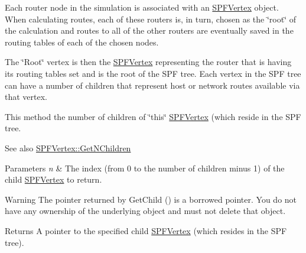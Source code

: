 Each router node in the simulation is associated with an \hyperlink{classns3_1_1SPFVertex}{S\+P\+F\+Vertex} object. When calculating routes, each of these routers is, in turn, chosen as the \char`\"{}root\char`\"{} of the calculation and routes to all of the other routers are eventually saved in the routing tables of each of the chosen nodes.

The \char`\"{}\+Root\char`\"{} vertex is then the \hyperlink{classns3_1_1SPFVertex}{S\+P\+F\+Vertex} representing the router that is having its routing tables set and is the root of the S\+PF tree. Each vertex in the S\+PF tree can have a number of children that represent host or network routes available via that vertex.

This method the number of children of \char`\"{}this\char`\"{} \hyperlink{classns3_1_1SPFVertex}{S\+P\+F\+Vertex} (which reside in the S\+PF tree.

\begin{DoxySeeAlso}{See also}
\hyperlink{classns3_1_1SPFVertex_a7586cee5234643454032e36b3383fc59}{S\+P\+F\+Vertex\+::\+Get\+N\+Children} 
\end{DoxySeeAlso}

\begin{DoxyParams}{Parameters}
{\em n} & The index (from 0 to the number of children minus 1) of the child \hyperlink{classns3_1_1SPFVertex}{S\+P\+F\+Vertex} to return. \\
\hline
\end{DoxyParams}
\begin{DoxyWarning}{Warning}
The pointer returned by Get\+Child () is a borrowed pointer. You do not have any ownership of the underlying object and must not delete that object. 
\end{DoxyWarning}
\begin{DoxyReturn}{Returns}
A pointer to the specified child \hyperlink{classns3_1_1SPFVertex}{S\+P\+F\+Vertex} (which resides in the S\+PF tree). 
\end{DoxyReturn}

